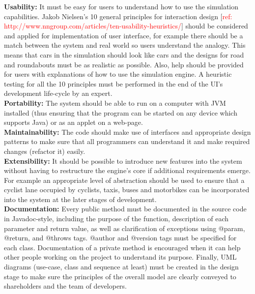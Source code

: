 \documentclass{article}
\begin{document}
\noindent 
\textbf{Usability:} It must be easy for users to understand how to use the simulation capabilities. Jakob Nielsen's 10 general principles for interaction design [\textcolor{red}{ref: http://www.nngroup.com/articles/ten-usability-heuristics/}] should be considered and applied for implementation of user interface, for example there should be a match between the system and real world so users understand the analogy. 
This means that cars in the simulation should look like cars and the designs for road and roundabouts must be as realistic as possible. 
Also, help should be provided for users with explanations of how to use the simulation engine. 
A heuristic testing for all the 10 principles must be performed in the end of the UI’s development life-cycle by an expert. \\

\noindent 
\textbf{Portability:} The system should be able to run on a computer with JVM installed (thus ensuring that the program can be started on any device which supports Java) or as an applet on a web-page. \\

\noindent
\textbf{Maintainability:} The code should make use of interfaces and appropriate design patterns to make sure that all programmers can understand it and make required changes (refactor it) easily.\\

\noindent 
\textbf{Extensibility:} It should be possible to introduce new features into the system without having to restructure the engine’s core if additional requirements emerge. 
For example an appropriate level of abstraction should be used to ensure that a cyclist lane occupied by cyclists, taxis, buses and motorbikes can be incorporated into the system at the later stages of development.\\

\noindent
\textbf{Documentation:} Every public method must be documented in the source code in Javadoc-style, including the purpose of the function, description of each parameter and return value, as well as clarification of exceptions using @param, @return, and @throws tags. @author and @version tags must be specified for each class. 
Documentation of a private method is encouraged when it can help other people working on the project to understand its purpose. 
Finally, UML diagrams (use-case, class and sequence at least) must be created in the design stage to make sure the principles of the overall model are clearly conveyed to shareholders and the team of developers.  
\end{document}
